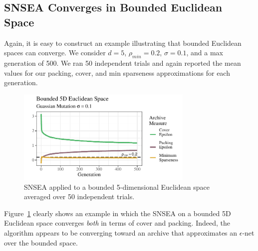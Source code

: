 \documentclass[twoside]{article}
\begin{document}
\subsection{SNSEA Converges in Bounded Euclidean Space}
\label{subsec:bounded}
Again, it is easy to construct an example illustrating that bounded Euclidean spaces can converge.  We consider $d=5$, $\rho_{min} = 0.2$, $\sigma=0.1$, and a max generation of 500.  We ran 50 independent trials and again reported the mean values for our packing, cover, and min sparseness approximations for each generation.  
\begin{figure}[h]
  \center\includegraphics[width=0.75\textwidth]{Figures/bounded-s01-r02-NOPOP.pdf}
  \caption{\label{fig:bounded:nopop:0103} SNSEA applied to a bounded 5-dimensional Euclidean space averaged over 50 independent trials.}
\end{figure}

Figure~\ref{fig:bounded:nopop:0103} clearly shows an example in which the SNSEA on a bounded 5D Euclidean space converges \emph{both} in terms of cover and packing.  Indeed, the algorithm appears to be converging toward an archive that approximates an $\epsilon$-net over the bounded space.  
\end{document}
